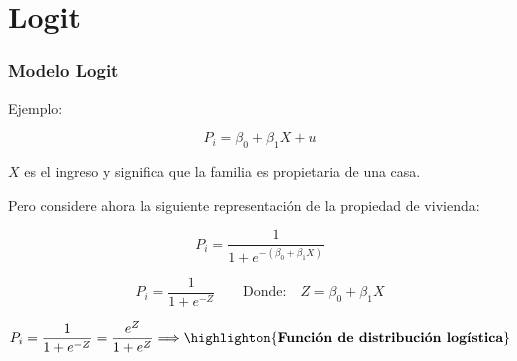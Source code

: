 \documentclass[10pt]{beamer}
\begin{document}



\section{Logit}
\begin{frame}
\frametitle{Modelo Logit}


Ejemplo: 

\begin{equation}
P_i = \beta_0 +\beta_1 X + u
\end{equation}

$X$ es el ingreso y  significa que la familia es propietaria de una casa.

\vspace{4mm}

Pero considere ahora la siguiente representación de la propiedad de vivienda:

\begin{equation}
P_i = \frac{1}{1 + e^{-(\beta_0 + \beta_1 X)}}
\end{equation}

\begin{equation}
P_i = \frac{1}{1 + e^{-Z}} \quad \quad \mbox{Donde:}  \quad Z = \beta_0 + \beta_1 X
\end{equation}

\begin{equation}
P_i = \frac{1}{1 + e^{-Z}} = \frac{e^Z}{1 + e^Z} \Longrightarrow \highlighton{\textbf{Función de distribución logística}}
\end{equation}


\end{frame}


\end{document}
